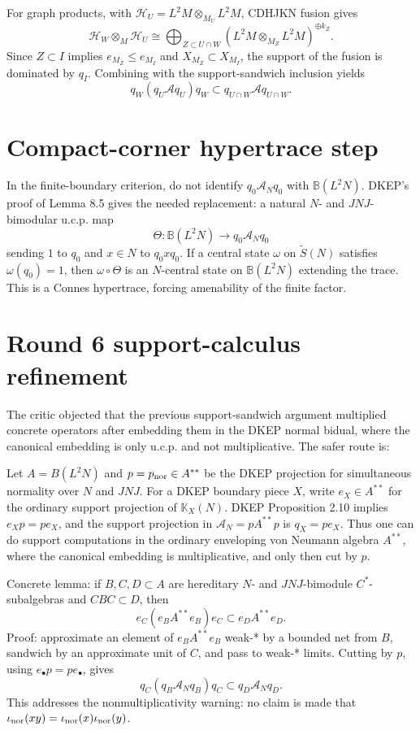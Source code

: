 \documentclass{article}
\begin{document}
For graph products, with $\mathcal H_U=L^2M\otimes_{M_U}L^2M$, CDHJKN fusion
gives
\[
  \mathcal H_W\otimes_M\mathcal H_U
  \cong \bigoplus_{Z\subset U\cap W}
       (L^2M\otimes_{M_Z}L^2M)^{\oplus k_Z}.
\]
Since $Z\subset I$ implies $e_{M_Z}\le e_{M_I}$ and $X_{M_Z}\subset X_{M_I}$,
the support of the fusion is dominated by $q_I$.  Combining with the
support-sandwich inclusion yields
\[
  q_W(q_U\mathcal A q_U)q_W\subset q_{U\cap W}\mathcal A q_{U\cap W}.
\]

\section*{Compact-corner hypertrace step}

In the finite-boundary criterion, do not identify
$q_0\mathcal A_Nq_0$ with $\mathbb B(L^2N)$.  DKEP's proof of Lemma 8.5 gives
the needed replacement: a natural $N$- and $JNJ$-bimodular u.c.p. map
\[
  \Theta:\mathbb B(L^2N)\to q_0\mathcal A_Nq_0
\]
sending $1$ to $q_0$ and $x\in N$ to $q_0xq_0$.  If a central state
$\omega$ on $\widetilde S(N)$ satisfies $\omega(q_0)=1$, then
$\omega\circ\Theta$ is an $N$-central state on $\mathbb B(L^2N)$ extending the
trace.  This is a Connes hypertrace, forcing amenability of the finite factor.



\section*{Round 6 support-calculus refinement}

The critic objected that the previous support-sandwich argument multiplied
concrete operators after embedding them in the DKEP normal bidual, where the
canonical embedding is only u.c.p. and not multiplicative.  The safer route is:

Let \(A=B(L^2N)\) and \(p=p_{\rm nor}\in A^{**}\) be the DKEP projection for
simultaneous normality over \(N\) and \(JNJ\).  For a DKEP boundary piece \(X\),
write \(e_X\in A^{**}\) for the ordinary support projection of
\(\mathbb K_X(N)\).  DKEP Proposition 2.10 implies \(e_Xp=pe_X\), and the
support projection in \(\mathcal A_N=pA^{**}p\) is \(q_X=pe_X\).  Thus one can
do support computations in the ordinary enveloping von Neumann algebra
\(A^{**}\), where the canonical embedding is multiplicative, and only then cut
by \(p\).

Concrete lemma: if \(B,C,D\subset A\) are hereditary \(N\)- and \(JNJ\)-bimodule
\(C^*\)-subalgebras and \(CBC\subset D\), then
\[
e_C(e_BA^{**}e_B)e_C\subset e_DA^{**}e_D.
\]
Proof: approximate an element of \(e_BA^{**}e_B\) weak-* by a bounded net from
\(B\), sandwich by an approximate unit of \(C\), and pass to weak-* limits.
Cutting by \(p\), using \(e_\bullet p=pe_\bullet\), gives
\[
q_C(q_B\mathcal A_Nq_B)q_C\subset q_D\mathcal A_Nq_D.
\]
This addresses the nonmultiplicativity warning: no claim is made that
\(\iota_{\rm nor}(xy)=\iota_{\rm nor}(x)\iota_{\rm nor}(y)\).
\end{document}
